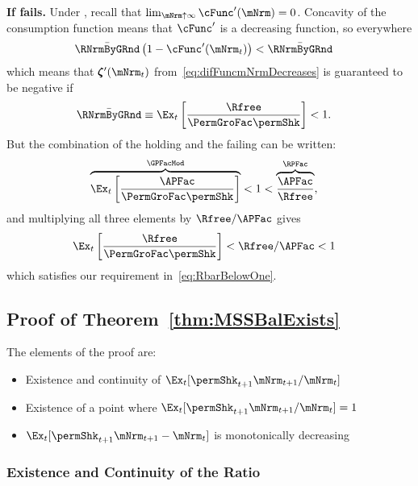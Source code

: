 \documentclass[\econtexRoot/BufferStockTheory]{subfiles}
\begin{document}
\textbf{If {\RIC} fails.}
Under \cncl{\RIC}, recall that $\lim_{\mNrm \uparrow \infty} \cFunc^{\prime}(\mNrm) = 0$.  Concavity of the consumption function means that $\cFunc^{\prime}$ is a decreasing function, so everywhere 
\begin{align*}
  \bar{\RNrmByGRnd}\left(1-\cFunc^{\prime}({\mNrm}_t)\right) & < \bar{\RNrmByGRnd}
\end{align*}
which means that $\difFunc^{\prime}(\mNrm_{t})$ from~\eqref{eq:difFuncmNrmDecreases} is guaranteed to be negative if
\begin{align}
  \bar{\RNrmByGRnd} \equiv \Ex_{t}\left[\frac{\Rfree}{\PermGroFac \permShk}\right] & < 1  \label{eq:RbarBelowOne}.
\end{align}
But the combination of the {\GICMod} holding and the {\RIC} failing can be written:
\begin{align*}
  \overbrace{\Ex_{t}\left[\frac{\APFac}{\PermGroFac \permShk}\right]}^{\GPFacMod} & < 1 < \overbrace{\frac{\APFac}{\Rfree}}^{{\RPFac}},
\end{align*}
and multiplying all three elements by $\Rfree/\APFac$ gives 
\begin{align*}
  \Ex_{t}\left[\frac{\Rfree}{\PermGroFac \permShk}\right] & < \Rfree/\APFac < 1
\end{align*}
which satisfies our requirement in~\eqref{eq:RbarBelowOne}.

  
\subsection{Proof of Theorem~\ref{thm:MSSBalExists}}


The elements of the proof are:
\begin{itemize}
\item Existence and continuity of $\Ex_{t}[\permShk_{t+1}\mNrm_{t+1}/\mNrm_t]$
\item Existence of a point where $\Ex_{t}[\permShk_{t+1}\mNrm_{t+1}/\mNrm_t] = 1$
\item $\Ex_{t}[\permShk_{t+1}\mNrm_{t+1}-\mNrm_{t}]$ is monotonically decreasing
\end{itemize}

\subsubsection{Existence and Continuity of the Ratio}%
\end{document}
